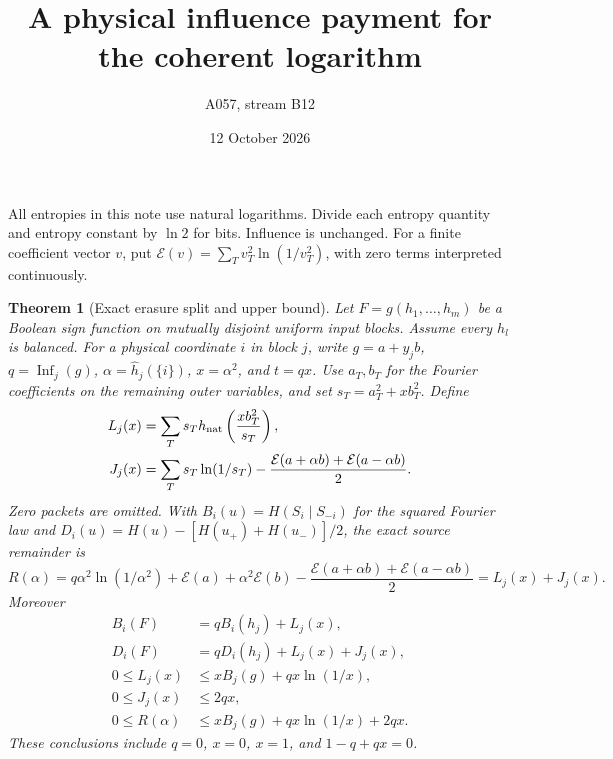 \documentclass{article}
\newtheorem{theorem}{Theorem}
\newcommand{\Er}{\mathcal E}
\begin{document}
\title{A physical influence payment for the coherent logarithm}
\author{A057, stream B12}\date{12 October 2026}\maketitle
All entropies in this note use natural logarithms. Divide each entropy
quantity and entropy constant by $\ln 2$ for bits. Influence is unchanged.
For a finite coefficient vector $v$, put
$\Er(v)=\sum_T v_T^2\ln(1/v_T^2)$, with zero terms interpreted continuously.

\begin{theorem}[Exact erasure split and upper bound]
Let $F=g(h_1,\ldots,h_m)$ be a Boolean sign function on mutually
disjoint uniform input blocks. Assume every $h_l$ is balanced. For a
physical coordinate $i$ in block $j$, write $g=a+y_jb$,
$q=\operatorname{Inf}_j(g)$, $\alpha=\widehat h_j(\{i\})$, $x=\alpha^2$,
and $t=qx$. Use $a_T,b_T$ for the Fourier coefficients on the remaining
outer variables, and set $s_T=a_T^2+xb_T^2$. Define
\begin{align*}
 L_j(x)&=\sum_Ts_T h_{\rm nat}\left(\frac{xb_T^2}{s_T}\right),\\
 J_j(x)&=\sum_Ts_T\ln(1/s_T)
       -\frac{\Er(a+\alpha b)+\Er(a-\alpha b)}2.
\end{align*}
Zero packets are omitted. With $B_i(u)=H(S_i\mid S_{-i})$ for the
squared Fourier law and $D_i(u)=H(u)-[H(u_+)+H(u_-)]/2$, the exact
source remainder is
\[
 R(\alpha)=q\alpha^2\ln(1/\alpha^2)+\Er(a)+\alpha^2\Er(b)
 -\frac{\Er(a+\alpha b)+\Er(a-\alpha b)}2=L_j(x)+J_j(x).
\]
Moreover
\begin{align*}
 B_i(F)&=qB_i(h_j)+L_j(x),\\
 D_i(F)&=qD_i(h_j)+L_j(x)+J_j(x),\\
 0\le L_j(x)&\le xB_j(g)+qx\ln(1/x),\\
 0\le J_j(x)&\le 2qx,\\
 0\le R(\alpha)&\le xB_j(g)+qx\ln(1/x)+2qx.
\end{align*}
These conclusions include $q=0$, $x=0$, $x=1$, and $1-q+qx=0$.
\end{theorem}
\end{document}
